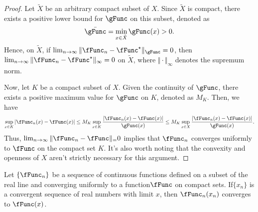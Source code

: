 \documentclass[\econtexRoot/BufferStockTheory]{subfiles}
\begin{document}
\begin{proof}
Let $\tilde{X}$ be an arbitrary compact subset of $X$.
Since $\tilde{X}$ is compact, there exists a positive lower bound for $\gFunc$ on this subset, denoted as 
\begin{equation}
\bar{\gFunc} = \min_{x \in \tilde{X}} \gFunc(x) > 0.
\end{equation}
Hence, on $\tilde{X}$, if $\lim_{n \to \infty} \Vert \fFunc_n - \fFunc^{\star} \Vert_\gFunc = 0$, then $\lim_{n \to \infty} \Vert \fFunc_n - \fFunc^{\star} \Vert_\infty = 0$ on $\tilde{X}$, where $\Vert \cdot \Vert_\infty$ denotes the supremum norm.


Now, let $K$ be a compact subset of $X$.
Given the continuity of $\gFunc$, there exists a positive maximum value for $\gFunc$ on $K$, denoted as $M_K$.
Then, we have
\begin{equation}
\sup_{x \in K} \vert \fFunc_n(x) - \fFunc(x)\vert  \leq M_K \sup_{x \in K} \frac{\vert \fFunc_n(x) - \fFunc(x)\vert }{\gFunc(x)} \leq M_K \sup_{x \in X} \frac{\vert \fFunc_n(x) - \fFunc(x)\vert }{\gFunc(x)}.
\end{equation}
Thus, $\lim_{n \to \infty} \Vert \fFunc_n - \fFunc \Vert_  = 0$ implies that $\fFunc_n$ converges uniformly to $\fFunc$ on the compact set $K$.
It's also worth noting that the convexity and openness of $X$ aren't strictly necessary for this argument.
\end{proof}

\begin{fact}\label{fact:compactnt}
Let $\{\fFunc_n\}$ be a sequence of continuous functions defined on a subset of the real line and converging uniformly to a function$\fFunc$ on compact sets.
If$\{x_n\}$ is a convergent sequence of real numbers with limit $x$, then $\fFunc_n(x_n)$ converges to $\fFunc(x)$.
\end{fact}
\end{document}
